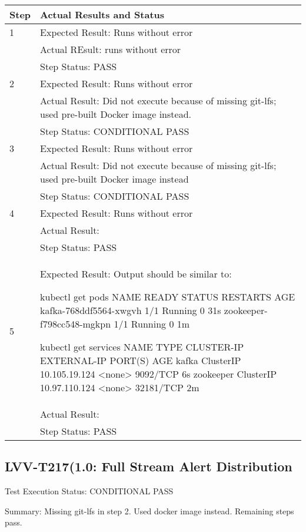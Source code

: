 \documentclass[DM,lsstdraft,STR,toc]{lsstdoc}
\begin{document}
\begin{longtable}{p{2cm}p{14cm}}
\hline
{Step} & {Actual Results and Status}\\ \hline
1 & Expected Result: Runs without error \\\cline{2-2}
  & Actual REsult: runs without error \\\cline{2-2}
  & Step Status: PASS \\\hline
2 & Expected Result: Runs without error \\\cline{2-2}
  & Actual Result: Did not execute because of missing git-lfs; used pre-built Docker image instead. \\\cline{2-2}
  & Step Status: CONDITIONAL PASS \\\hline
3 & Expected Result: Runs without error \\\cline{2-2}
  & Actual Result: Did not execute because of missing git-lfs; used pre-built Docker image instead \\\cline{2-2}
  & Step Status: CONDITIONAL PASS \\\hline
4 & Expected Result: Runs without error \\\cline{2-2}
  & Actual Result: \\\cline{2-2}
  & Step Status: PASS \\\hline
5 & Expected Result: Output should be similar to:

kubectl get pods
NAME                        READY     STATUS    RESTARTS   AGE
kafka-768ddf5564-xwgvh      1/1       Running   0          31s
zookeeper-f798cc548-mgkpn   1/1       Running   0          1m

kubectl get services
NAME        TYPE        CLUSTER-IP      EXTERNAL-IP   PORT(S)     AGE
kafka       ClusterIP   10.105.19.124   <none>        9092/TCP    6s
zookeeper   ClusterIP   10.97.110.124   <none>        32181/TCP   2m
\\\cline{2-2}
  & Actual Result: \\\cline{2-2}
  & Step Status: PASS \\\hline
\end{longtable}


\subsection{LVV-T217(1.0: Full Stream Alert Distribution}
\label{sect:detail-lvv-t216}

Test Execution Status: CONDITIONAL PASS

Summary: Missing git-lfs in step 2. Used docker image instead. Remaining steps pass.
\end{document}
